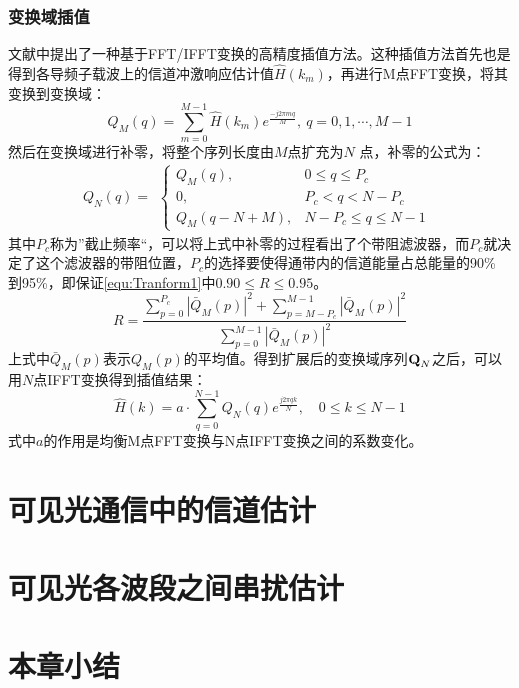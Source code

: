 \subsubsection{变换域插值}
文献中提出了一种基于FFT/IFFT变换的高精度插值方法。这种插值方法首先也是得到各导频子载波上的信道冲激响应估计值$\hat{H}(k_m)$，再进行M点FFT变换，将其变换到变换域：
\begin{equation}
Q_M(q)=\sum_{m=0}^{M-1}\hat{H}(k_m)e^{\frac{-j2\pi mq}{M}},\ q=0,1,\cdots,M-1
\end{equation}
然后在变换域进行补零，将整个序列长度由$M$点扩充为$N$ 点，补零的公式为：
\begin{equation}
Q_N(q)=
\begin{aligned}
\begin{cases}
Q_M(q), &0\leq q \leq P_c \\
0, &P_c < q < N-P_c \\
Q_M(q-N+M),&N-P_c \leq  q \leq N-1
\end{cases}
\end{aligned}
\end{equation}
其中$P_c$称为”截止频率“，可以将上式中补零的过程看出了个带阻滤波器，而$P_c$就决定了这个滤波器的带阻位置，$P_c$的选择要使得通带内的信道能量占总能量的90\% 到95\%，即保证\ref{equ:Tranform1}中$0.90\leq R \leq 0.95$。
\begin{equation}
R=\frac{\sum_{p=0}^{P_c}|\bar{Q}_M(p)|^2+\sum_{p=M-P_c}^{M-1}|\bar{Q}_M(p)|^2}{\sum_{p=0}^{M-1}|\bar{Q}_M(p)|^2}
\label{equ:Tranform1}
\end{equation}
上式中$\bar{Q}_M(p)$表示$Q_M(p)$的平均值。得到扩展后的变换域序列$\textbf Q_N$之后，可以用$N$点IFFT变换得到插值结果：
\begin{equation}
\hat{H}(k) = a\cdot \sum_{q=0}^{N-1}Q_N(q)e^{\frac{j2\pi qk}{N}}, \quad 0\leq k \leq N-1
\end{equation}
式中$a$的作用是均衡M点FFT变换与N点IFFT变换之间的系数变化。
\section{可见光通信中的信道估计}
\section{可见光各波段之间串扰估计}
\section{本章小结}
